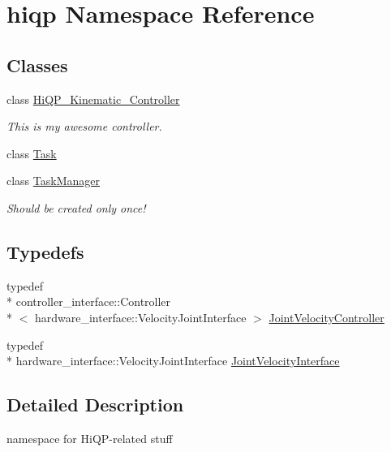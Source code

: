 \hypertarget{namespacehiqp}{\section{hiqp Namespace Reference}
\label{namespacehiqp}
}
\subsection*{Classes}
\begin{DoxyCompactItemize}
\item 
class \hyperlink{classhiqp_1_1HiQP__Kinematic__Controller}{Hi\-Q\-P\-\_\-\-Kinematic\-\_\-\-Controller}
\begin{DoxyCompactList}\small\item\em This is my awesome controller. \end{DoxyCompactList}\item 
class \hyperlink{classhiqp_1_1Task}{Task}
\item 
class \hyperlink{classhiqp_1_1TaskManager}{Task\-Manager}
\begin{DoxyCompactList}\small\item\em Should be created only once! \end{DoxyCompactList}\end{DoxyCompactItemize}
\subsection*{Typedefs}
\begin{DoxyCompactItemize}
\item 
typedef \\*
controller\-\_\-interface\-::\-Controller\\*
$<$ hardware\-\_\-interface\-::\-Velocity\-Joint\-Interface $>$ \hyperlink{namespacehiqp_a7b250295f6797153486ce8ab085bd450}{Joint\-Velocity\-Controller}
\item 
typedef \\*
hardware\-\_\-interface\-::\-Velocity\-Joint\-Interface \hyperlink{namespacehiqp_ac536ca3b4ba33489281fa5bec490799c}{Joint\-Velocity\-Interface}
\end{DoxyCompactItemize}


\subsection{Detailed Description}
namespace for Hi\-Q\-P-\/related stuff 


